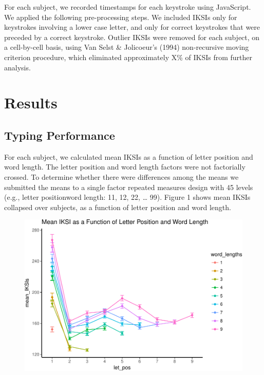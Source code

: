 \documentclass[floatsintext,man]{apa6}
\theoremstyle{definition}
\theoremstyle{definition}
\theoremstyle{definition}
\theoremstyle{remark}
\begin{document}
For each subject, we recorded timestamps for each keystroke using
JavaScript. We applied the following pre-processing steps. We included
IKSIs only for keystrokes involving a lower case letter, and only for
correct keystrokes that were preceded by a correct keystroke. Outlier
IKSIs were removed for each subject, on a cell-by-cell basis, using Van
Selst \& Jolicoeur's (1994) non-recursive moving criterion procedure,
which eliminated approximately X\% of IKSIs from further analysis.

\section{Results}\label{results}

\subsection{Typing Performance}\label{typing-performance}

For each subject, we calculated mean IKSIs as a function of letter
position and word length. The letter position and word length factors
were not factorially crossed. To determine whether there were
differences among the means we submitted the means to a single factor
repeated measures design with 45 levels (e.g., letter
position\textbar{}word length: 1\textbar{}1, 1\textbar{}2, 2\textbar{}2,
\ldots{} 9\textbar{}9). Figure 1 shows mean IKSIs collapsed over
subjects, as a function of letter position and word length.

\begin{figure}[htbp]
\centering
\includegraphics{Entropy_typing_draft_files/figure-latex/typing_mean_iksis_plot-1.pdf}
\caption{}
\end{figure}
\end{document}
